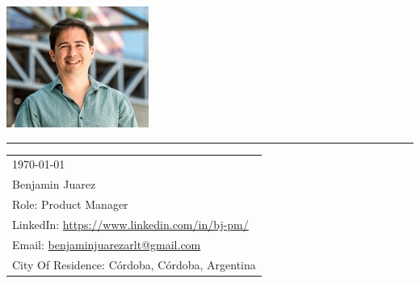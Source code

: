 
\includegraphics[width=0.35\textwidth]{pic.png} %

\vspace{-1em} %

\rule{\linewidth}{1pt} %

\bigskip\bigskip %



\hfill
\begin{tabular}{l @{}}
	\today \bigskip\\ %
	Benjamin Juarez \smallskip \\
	Role: 
Product Manager 
	\\ %
	LinkedIn: \href{https://www.linkedin.com/in/bj-pm/?locale=en_US}{https://www.linkedin.com/in/bj-pm/} \\
	Email: \href{benjaminjuarezarlt@gmail.com}{benjaminjuarezarlt@gmail.com} \\
	City Of Residence: Córdoba, Córdoba, Argentina
\end{tabular}


